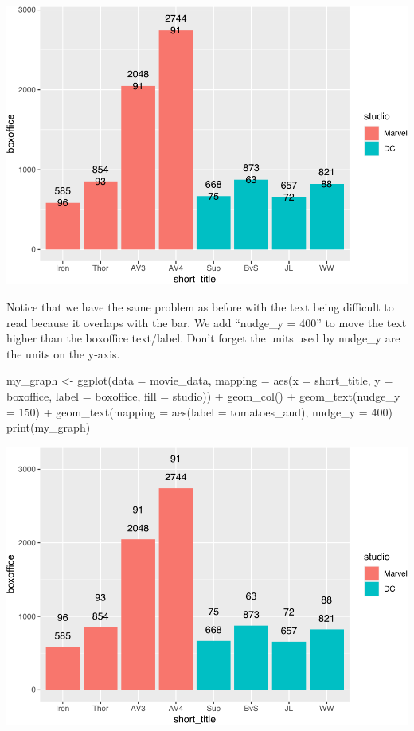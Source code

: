 \documentclass[
]{krantz}
\makeatletter
\newenvironment{Shaded}{\begin{snugshade}}{\end{snugshade}}
\newcommand{\AttributeTok}[1]{\textcolor[rgb]{0.61,0.61,0.61}{#1}}
\newcommand{\DecValTok}[1]{\textcolor[rgb]{0.06,0.06,0.06}{#1}}
\newcommand{\FunctionTok}[1]{\textcolor[rgb]{0,0,0}{#1}}
\newcommand{\NormalTok}[1]{#1}
\newcommand{\OtherTok}[1]{\textcolor[rgb]{0.37,0.37,0.37}{#1}}
\newcommand{\SpecialCharTok}[1]{\textcolor[rgb]{0,0,0}{#1}}
\newenvironment{kframe}{%
\medskip{}
\setlength{\fboxsep}{.8em}
 \def\at@end@of@kframe{}%
 \ifinner\ifhmode%
  \def\at@end@of@kframe{\end{minipage}}%
  \begin{minipage}{\columnwidth}%
 \fi\fi%
 \def\FrameCommand##1{\hskip\@totalleftmargin \hskip-\fboxsep
 \colorbox{shadecolor}{##1}\hskip-\fboxsep
     \hskip-\linewidth \hskip-\@totalleftmargin \hskip\columnwidth}%
 \MakeFramed {\advance\hsize-\width
   \@totalleftmargin\z@ \linewidth\hsize
   \@setminipage}}%
 {\par\unskip\endMakeFramed%
 \at@end@of@kframe}
\renewenvironment{Shaded}{\begin{kframe}}{\end{kframe}}
\makeatother
\begin{document}
\includegraphics[width=0.65\linewidth]{bookdown_files/figure-latex/unnamed-chunk-203-1}

Notice that we have the same problem as before with the text being difficult to read because it overlaps with the bar. We add ``nudge\_y = 400'' to move the text higher than the boxoffice text/label. Don't forget the units used by nudge\_y are the units on the y-axis.

\begin{Shaded}
\begin{Highlighting}[]
\NormalTok{my\_graph }\OtherTok{\textless{}{-}} \FunctionTok{ggplot}\NormalTok{(}\AttributeTok{data =}\NormalTok{ movie\_data,}
           \AttributeTok{mapping =} \FunctionTok{aes}\NormalTok{(}\AttributeTok{x =}\NormalTok{ short\_title,}
                         \AttributeTok{y =}\NormalTok{ boxoffice,}
                         \AttributeTok{label =}\NormalTok{ boxoffice, }
                         \AttributeTok{fill =}\NormalTok{ studio)) }\SpecialCharTok{+}
  \FunctionTok{geom\_col}\NormalTok{() }\SpecialCharTok{+}
  \FunctionTok{geom\_text}\NormalTok{(}\AttributeTok{nudge\_y =} \DecValTok{150}\NormalTok{)  }\SpecialCharTok{+}
  \FunctionTok{geom\_text}\NormalTok{(}\AttributeTok{mapping =} \FunctionTok{aes}\NormalTok{(}\AttributeTok{label =}\NormalTok{ tomatoes\_aud), }
            \AttributeTok{nudge\_y =} \DecValTok{400}\NormalTok{) }
\FunctionTok{print}\NormalTok{(my\_graph)}
\end{Highlighting}
\end{Shaded}

\includegraphics[width=0.65\linewidth]{bookdown_files/figure-latex/unnamed-chunk-204-1}
\end{document}

